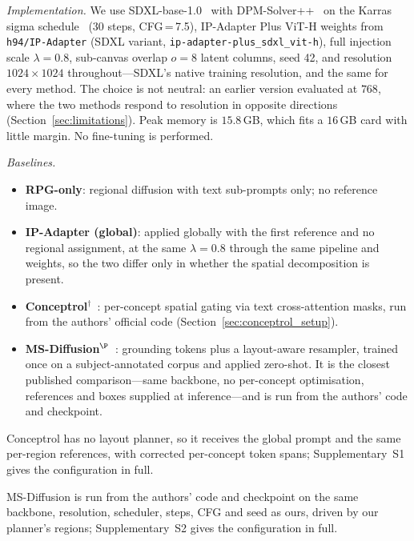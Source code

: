 \documentclass[review,10pt,times]{elsarticle}
\begin{document}
\noindent\textit{Implementation.}
We use SDXL-base-1.0~\cite{podell2024sdxl} with
DPM-Solver++~\cite{lu2022dpmsolver} on the Karras sigma
schedule~\cite{karras2022elucidating}
(30 steps, CFG\,=\,7.5), IP-Adapter Plus ViT-H weights from
\texttt{h94/IP-Adapter} (SDXL variant, \texttt{ip-adapter-plus\_sdxl\_vit-h}),
full injection scale $\lambda=0.8$, sub-canvas overlap $o=8$ latent columns,
seed 42, and resolution $1024\!\times\!1024$ throughout---SDXL's native
training resolution, and the same for every method.  The choice is not
neutral: an earlier version evaluated at $768$, where the two methods respond
to resolution in opposite directions (Section~\ref{sec:limitations}).  Peak
memory is $15.8$\,GB, which fits a $16$\,GB card with little margin.  No
fine-tuning is performed.

\noindent\textit{Baselines.}
\begin{itemize}\setlength\itemsep{2pt}
\item \textbf{RPG-only}: regional diffusion with text sub-prompts
      only; no reference image.
\item \textbf{IP-Adapter (global)}: applied globally with the first
      reference and no regional assignment, at the same $\lambda{=}0.8$
      through the same pipeline and weights, so the two differ only in
      whether the spatial decomposition is present.
\item \textbf{Conceptrol}$^{\dagger}$~\cite{he2025conceptrol}: per-concept
      spatial gating via text cross-attention masks, run from the authors'
      official code (Section~\ref{sec:conceptrol_setup}).
\item \textbf{MS-Diffusion}$^{\P}$~\cite{wang2025msdiffusion}: grounding
      tokens plus a layout-aware resampler, trained once on a
      subject-annotated corpus and applied zero-shot.  It is the closest
      published comparison---same backbone, no per-concept optimisation,
      references and boxes supplied at inference---and is run from the
      authors' code and checkpoint.
\end{itemize}

Conceptrol has no layout planner, so it receives the global prompt
and the same per-region references, with corrected per-concept token spans;
Supplementary~S1 gives the configuration in full.


MS-Diffusion is run from the authors' code and checkpoint on the
same backbone, resolution, scheduler, steps, CFG and seed as ours, driven by
our planner's regions; Supplementary~S2 gives the configuration in full.
\end{document}
